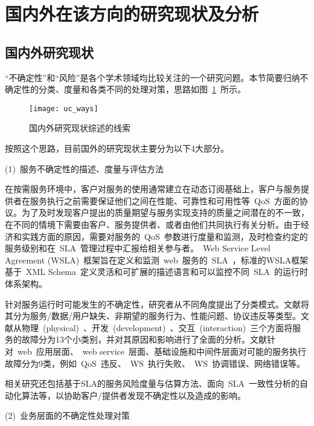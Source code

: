 \section{国内外在该方向的研究现状及分析}
\subsection{国内外研究现状}

“不确定性”和“风险”是各个学术领域均比较关注的一个研究问题。本节简要归纳不确定性的分类、度量和各类不同的处理对策，思路如图~\ref{uc_ways}~所示。

\begin{figure}[htbp]
\centering
\texttt{[image: uc\_ways]}
\caption{国内外研究现状综述的线索}\label{uc_ways}
\vspace{-1em}
\end{figure}

按照这个思路，目前国外的研究现状主要分为以下4大部分。

(1)~服务不确定性的描述、度量与评估方法

在按需服务环境中，客户对服务的使用通常建立在动态订阅基础上，客户与服务提供者在服务执行之前需要保证他们之间在性能、可靠性和可用性等~QoS~方面的协议。为了及时发现客户提出的质量期望与服务实现支持的质量之间潜在的不一致，在不同的情境下需要由客户、服务提供者、或者由他们共同执行有关分析。由于经济和实践方面的原因，需要对服务的~QoS~参数进行度量和监测，及时检查约定的服务级别和在~SLA~管理过程中汇报给相关参与者。~Web Service Level Agreement (WSLA)~框架旨在定义和监测~web~服务的~SLA~，标准的WSLA框架基于~XML Schema~定义灵活和可扩展的描述语言和可以监控不同~SLA~的运行时体系架构。

针对服务运行时可能发生的不确定性，研究者从不同角度提出了分类模式。文献\cite{kokash2007evaluating}将其分为服务/数据/用户缺失、非期望的服务行为、性能问题、协议违反等类型。文献\cite{chan2009fault}从物理~(physical)~、开发~(development)~、交互~(interaction)~三个方面将服务的故障分为13个小类别，并对其原因和影响进行了全面的分析。文献针对~web~应用层面、~web service~层面、基础设施和中间件层面对可能的服务执行故障分为9类，例如~QoS~违反、~WS~执行失败、~WS~协调错误、网络错误等。

相关研究还包括基于SLA的服务风险度量与估算方法、面向~SLA~一致性分析的自动化算法等，以协助客户/提供者发现不确定性以及造成的影响。

(2)~业务层面的不确定性处理对策

